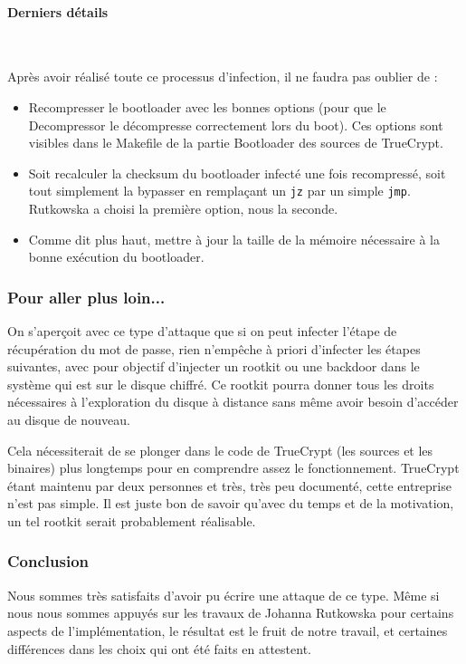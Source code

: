 \documentclass[12pt,a4paper]{article}
\begin{document}
\paragraph{Derniers détails} ~

Après avoir réalisé toute ce processus d'infection, il ne faudra pas oublier de :
\begin{itemize}
    \item Recompresser le bootloader avec les bonnes options (pour que le
    Decompressor le décompresse correctement lors du boot). Ces options sont
    visibles dans le Makefile de la partie Bootloader des sources de TrueCrypt.
    \item Soit recalculer la checksum du bootloader infecté une fois recompressé,
    soit tout simplement la bypasser en remplaçant un \texttt{jz} par un simple
    \texttt{jmp}. Rutkowska a choisi la première option, nous la seconde.
    \item Comme dit plus haut, mettre à jour la taille de la mémoire nécessaire
    à la bonne exécution du bootloader.
\end{itemize}

\subsubsection{Pour aller plus loin...}

On s'aperçoit avec ce type d'attaque que si on peut infecter l'étape de
récupération du mot de passe, rien n'empêche à priori d'infecter les étapes 
suivantes, avec pour objectif d'injecter un rootkit ou une backdoor dans le
système qui est sur le disque chiffré. Ce rootkit pourra donner tous les droits
nécessaires à l'exploration du disque à distance sans même avoir besoin
d'accéder au disque de nouveau.

Cela nécessiterait de se plonger dans le code de TrueCrypt (les sources et les
binaires) plus longtemps pour en comprendre assez le fonctionnement. TrueCrypt
étant maintenu par deux personnes et très, très peu documenté, cette entreprise
n'est pas simple. Il est juste bon de savoir qu'avec du temps et de la motivation,
un tel rootkit serait probablement réalisable.

\subsubsection{Conclusion}

Nous sommes très satisfaits d'avoir pu écrire une attaque de ce type. Même si
nous nous sommes appuyés sur les travaux de Johanna Rutkowska pour certains
aspects de l'implémentation, le résultat est le fruit de notre travail, et
certaines différences dans les choix qui ont été faits en attestent.
\end{document}
